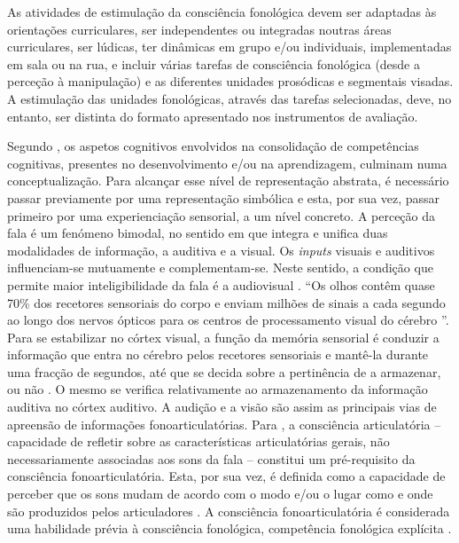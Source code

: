 \documentclass[output=paper,colorlinks,citecolor=brown,booklanguage=portuguese]{langscibook}
\begin{document}
As atividades de estimulação da consciência fonológica devem ser adaptadas às orientações curriculares, ser independentes ou integradas noutras áreas curriculares, ser lúdicas, ter dinâmicas em grupo e/ou individuais, implementadas em sala ou na rua, e incluir várias tarefas de consciência fonológica (desde a perceção à manipulação) e as diferentes unidades prosódicas e segmentais visadas. A estimulação das unidades fonológicas, através das tarefas selecionadas, deve, no entanto, ser distinta do formato apresentado nos instrumentos de avaliação.

Segundo \citet{Wolfe2004}, os aspetos cognitivos envolvidos na consolidação de competências cognitivas, presentes no desenvolvimento e/ou na aprendizagem, culminam numa conceptualização. Para alcançar esse nível de representação abstrata, é necessário passar previamente por uma representação simbólica e esta, por sua vez, passar primeiro por uma experienciação sensorial, a um nível concreto. A perceção da fala é um fenómeno bimodal, no sentido em que integra e unifica duas modalidades de informação, a auditiva e a visual. Os \emph{inputs} visuais e auditivos influenciam-se mutuamente e complementam-se. Neste sentido, a condição que permite maior inteligibilidade da fala é a audiovisual \citep{Skipper2007}. “Os olhos contêm quase 70\% dos recetores sensoriais do corpo e enviam milhões de sinais a cada segundo ao longo dos nervos ópticos para os centros de processamento visual do cérebro \citep[145]{Wolfe2004}”. Para se estabilizar no córtex visual, a função da memória sensorial é conduzir a informação que entra no cérebro pelos recetores sensoriais e mantê-la durante uma fracção de segundos, até que se decida sobre a pertinência de a armazenar, ou não \citep[145]{Wolfe2004}. O mesmo se verifica relativamente ao armazenamento da informação auditiva no córtex auditivo. A audição e a visão são assim as principais vias de apreensão de informações fonoarticulatórias. Para \citet{VidorSouza2009}, a consciência articulatória -- capacidade de refletir sobre as características articulatórias gerais, não necessariamente associadas aos sons da fala -- constitui um pré-requisito da consciência fonoarticulatória. Esta, por sua vez, é definida como a capacidade de perceber que os sons mudam de acordo com o modo e/ou o lugar como e onde são produzidos pelos articuladores \citep{Santos2009}. A consciência fonoarticulatória é considerada uma habilidade prévia à consciência fonológica, competência fonológica explícita \citep{VidorSouza2009}.
\end{document}
